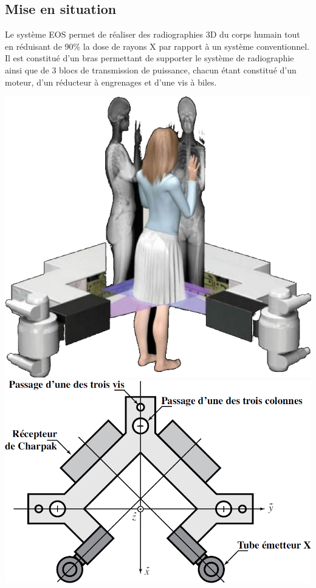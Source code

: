 \documentclass[10pt,fleqn]{article} %
\begin{document}
\def\pathfig{images}

\vspace{4.5cm}
\pagestyle{fancy}
\thispagestyle{plain}

\def\columnseprulecolor{\color{ocre}}
\setlength{\columnseprule}{0.4pt} 

\def\pathfig{images}

\ifprof
\begin{multicols}{2}
\else
\begin{multicols}{2}
\fi


\subsection*{Mise en situation}

Le système EOS permet de réaliser des radiographies 3D du corps humain tout en réduisant de 90\% la dose de rayons X par rapport à un système conventionnel. Il est constitué d'un bras permettant de supporter le système de radiographie ainsi que de 3 blocs de transmission de puissance, chacun étant constitué d'un moteur, d'un réducteur à engrenages et d'une vis à biles. 

%
\begin{center}
\includegraphics[width=.48\linewidth]{images/fig_02}
\includegraphics[width=.48\linewidth]{images/fig_03}
\end{center}


\end{multicols}
\end{multicols}
\end{document}
